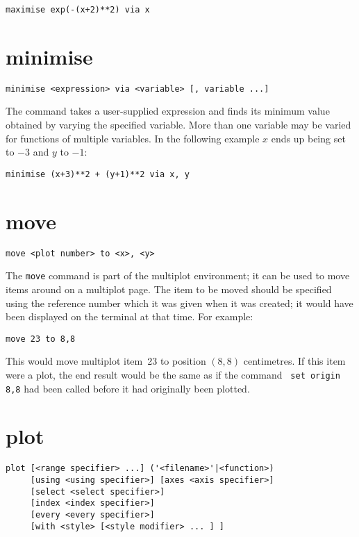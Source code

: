 \begin{verbatim}
maximise exp(-(x+2)**2) via x
\end{verbatim}

\section{minimise}

\begin{verbatim}
minimise <expression> via <variable> [, variable ...]
\end{verbatim}

The  command takes a user-supplied expression and finds its
minimum value obtained by varying the specified variable.  More than one
variable may be varied for functions of multiple variables.  In the following
example $x$ ends up being set to $-3$ and $y$ to $-1$:

\begin{verbatim}
minimise (x+3)**2 + (y+1)**2 via x, y
\end{verbatim}

\section{move}

\begin{verbatim}
move <plot number> to <x>, <y>
\end{verbatim}

The {\tt move} command is part of the multiplot environment; it can be used to
move items around on a multiplot page. The item to be moved should be specified
using the reference number which it was given when it was created; it would
have been displayed on the terminal at that time. For example:

\begin{verbatim}
move 23 to 8,8
\end{verbatim}
  
\noindent This would move multiplot item~23 to position $(8,8)$ centimetres. If
this item were a plot, the end result would be the same as if the command {\tt
set origin 8,8} had been called before it had originally been plotted.

\section{plot}

\begin{verbatim}
plot [<range specifier> ...] ('<filename>'|<function>)
     [using <using specifier>] [axes <axis specifier>]
     [select <select specifier>]
     [index <index specifier>]
     [every <every specifier>]
     [with <style> [<style modifier> ... ] ]
\end{verbatim}

